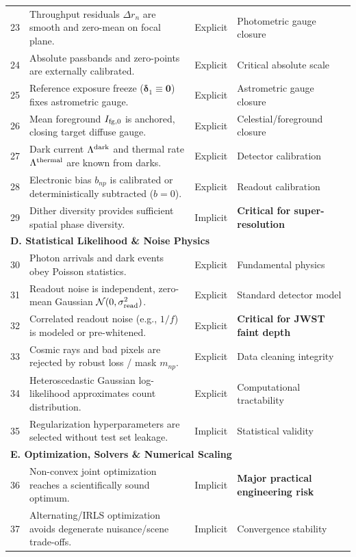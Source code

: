 \documentclass[11pt,a4paper]{article}
\begin{document}
\begin{longtable}{r p{8.2cm} c p{4.0cm}}
23 & Throughput residuals $\Delta r_n$ are smooth and zero-mean on focal plane. & Explicit & Photometric gauge closure \\
24 & Absolute passbands and zero-points are externally calibrated. & Explicit & Critical absolute scale \\
25 & Reference exposure freeze ($\boldsymbol{\delta}_1 \equiv \mathbf{0}$) fixes astrometric gauge. & Explicit & Astrometric gauge closure \\
26 & Mean foreground $I_{{\rm fg},0}$ is anchored, closing target diffuse gauge. & Explicit & Celestial/foreground closure \\
27 & Dark current $\Lambda^{\rm dark}$ and thermal rate $\Lambda^{\rm thermal}$ are known from darks. & Explicit & Detector calibration \\
28 & Electronic bias $b_{np}$ is calibrated or deterministically subtracted ($b=0$). & Explicit & Readout calibration \\
29 & Dither diversity provides sufficient spatial phase diversity. & Implicit & \textbf{Critical for super-resolution} \\
\midrule
\multicolumn{4}{l}{\textbf{D. Statistical Likelihood \& Noise Physics}} \\
30 & Photon arrivals and dark events obey Poisson statistics. & Explicit & Fundamental physics \\
31 & Readout noise is independent, zero-mean Gaussian $\mathcal{N}(0, \sigma_{\rm read}^2)$. & Explicit & Standard detector model \\
32 & Correlated readout noise (e.g., $1/f$) is modeled or pre-whitened. & Explicit & \textbf{Critical for JWST faint depth} \\
33 & Cosmic rays and bad pixels are rejected by robust loss / mask $m_{np}$. & Explicit & Data cleaning integrity \\
34 & Heteroscedastic Gaussian log-likelihood approximates count distribution. & Explicit & Computational tractability \\
35 & Regularization hyperparameters are selected without test set leakage. & Implicit & Statistical validity \\
\midrule
\multicolumn{4}{l}{\textbf{E. Optimization, Solvers \& Numerical Scaling}} \\
36 & Non-convex joint optimization reaches a scientifically sound optimum. & Implicit & \textbf{Major practical engineering risk} \\
37 & Alternating/IRLS optimization avoids degenerate nuisance/scene trade-offs. & Implicit & Convergence stability \\

\end{longtable}
\end{document}
